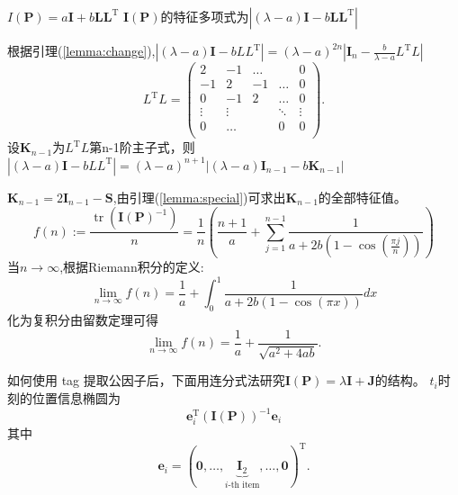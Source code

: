 \documentclass[notheorems,xetex]{beamer}
\DeclareMathOperator{\tr}{tr}
\theoremstyle{definition}
\begin{document}
\begin{frame}[noframenumbering]{$I(\bm{P})=a\bm{I}+b \bm{L}\bm{L}^{\textrm{T}}$}
$\bm{I}(\bm{P})$的特征多项式为$|(\lambda-a)\bm{I}-b\bm{L}\bm{L}^{\textrm{T}}|$
\pause

根据引理(\ref{lemma:change}),$|(\lambda-a)\bm{I}-bLL^{\textrm{T}}|=(\lambda-a)^{2n}|\bm{I}_n-\frac{b}{\lambda-a}L^{\textrm{T}}L|$
\[L^{\textrm{T}}L=\left(
\begin{array}{ccccc}
2&-1&\dots&&0\\
-1&2&-1&\dots&0\\
0&-1&2&\dots&0\\
\vdots &\vdots&&\ddots &\vdots\\
0&\dots&&0&0\\
\end{array}
\right).
\]
\pause
设$\bm{K}_{n-1}$为$L^{\textrm{T}}L$第n-1阶主子式，则
$|(\lambda-a)\bm{I}-bLL^{\textrm{T}}|=(\lambda-a)^{n+1}|(\lambda-a)\bm{I}_{n-1}-b\bm{K}_{n-1}|$
\end{frame}
\begin{frame}[noframenumbering]
$\bm{K}_{n-1}=2\bm{I}_{n-1}-\bm{S}$,由引理(\ref{lemma:special})可求出$\bm{K}_{n-1}$的全部特征值。
\pause
\[
f(n):=\frac{\tr(\bm{I}(\bm{P})^{-1})}{n}=\frac{1}{n}\left(\frac{n+1}{a}+\sum_{j=1}^{n-1}\frac{1}{a+2b(1-\cos(\frac{\pi j}{n}))}\right)
\]
当$n\to \infty$,根据Riemann积分的定义:
\[
\lim_{n\rightarrow \infty}f(n)=\frac{1}{a}+\int_0^1 \frac{1}{a+2b(1-\cos(\pi x))}dx
\]
化为复积分由留数定理可得
\[
\lim_{n\rightarrow \infty}f(n)=\frac{1}{a}+\frac{1}{\sqrt{a^2+4ab}}.
\]
\end{frame}
\begin{frame}[noframenumbering]{如何使用 tag}
提取公因子后，下面用连分式法研究$\bm{I}(\bm{P})=\lambda \bm{I}+\bm{J}$的结构。
\pause
$t_{i}$时刻的位置信息椭圆为
\[
\bm{e}_{i}^{\textrm{T}}(\bm{I}(\bm{P}))^{-1}\bm{e}_{i}
\]
其中
\begin{equation*}
\bm{e}_i=(\bm{0},\dots,\underbrace{\bm{I}_2}_{i\text{-th item}},\dots,\bm{0})^{\textrm{T}}.
\end{equation*}
\end{frame}
\end{document}
